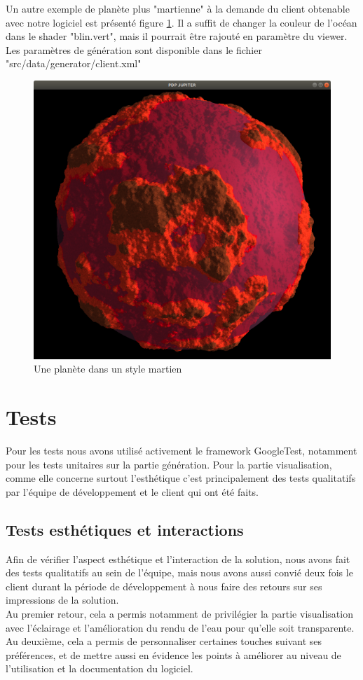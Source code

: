\documentclass[a4paper]{article}
\begin{document}
\newpage
Un autre exemple de planète plus "martienne" à la demande du client obtenable avec notre logiciel est présenté figure \ref{notre_planete_mars}. Il a suffit de changer la couleur de l'océan dans le shader "blin.vert", mais il pourrait être rajouté en paramètre du viewer. Les paramètres de génération sont disponible dans le fichier "src/data/generator/client.xml"

\begin{figure}[!ht]
    \begin{center}
        \includegraphics[width=0.6\linewidth]{img/notre_planete_mars.png} 
        \caption{Une planète dans un style martien}
        \label{notre_planete_mars}
    \end{center}
\end{figure}

\newpage 
\section{Tests}

Pour les tests nous avons utilisé activement le framework GoogleTest, notamment pour les tests unitaires sur la partie génération. 
Pour la partie visualisation, comme elle concerne surtout l'esthétique c'est principalement des tests qualitatifs par l'équipe de développement et le client qui ont été faits.

\subsection{Tests esthétiques et interactions}

Afin de vérifier l'aspect esthétique et l'interaction de la solution, nous avons fait des tests qualitatifs au sein de l'équipe, mais nous avons aussi convié deux fois le client durant la période de développement à nous faire des retours sur ses impressions de la solution.\\
Au premier retour, cela a permis notamment de privilégier la partie visualisation avec l'éclairage et l'amélioration du rendu de l'eau pour qu'elle soit transparente. \\
Au deuxième, cela a permis de personnaliser certaines touches suivant ses préférences, et de mettre aussi en évidence les points à améliorer au niveau de l'utilisation et la documentation du logiciel.
\end{document}
